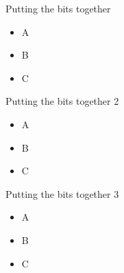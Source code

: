 \begin{frame}{Putting the bits together}
    \begin{itemize}
        \item A
        \item B
        \item C
    \end{itemize}
\end{frame}

\begin{frame}{Putting the bits together 2}
    \begin{itemize}
        \item A
        \item B
        \item C
    \end{itemize}
\end{frame}

\begin{frame}{Putting the bits together 3}
    \begin{itemize}
        \item A
        \item B
        \item C
    \end{itemize}
\end{frame}